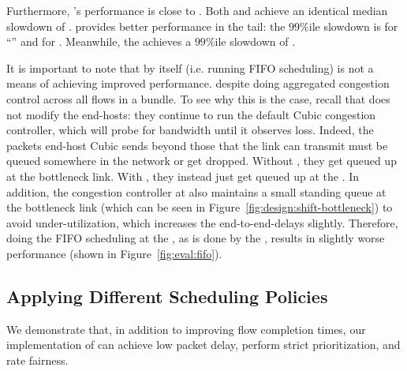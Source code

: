 Furthermore, \name's performance is close to \optimal.
Both \name and \optimal achieve an identical median slowdown of \overviewBenefitsBundlerMedian.
\optimal provides better performance in the tail: the $99\%$ile slowdown is \overviewBenefitsOptimalTail for ``\optimal'' and \overviewBenefitsBundlerTail for \name.
Meanwhile, the \baseline achieves a $99\%$ile slowdown of \overviewBenefitsBaselineTail.

 It is important to note that \name by itself (i.e. running FIFO scheduling) is not a means of achieving improved performance. 
despite doing aggregated congestion control across all flows in a bundle.
To see why this is the case, recall that \name does not modify the end-hosts: they continue to run the default Cubic congestion controller, which will probe for bandwidth until it observes loss.
Indeed, the packets end-host Cubic sends beyond those that the link can transmit must be queued somewhere in the network or get dropped. Without \name, they get queued up at the bottleneck link. With \name, they instead just get queued up at the \inbox. In addition, the congestion controller at \inbox also maintains a small standing queue at the bottleneck link (which can be seen in Figure~\ref{fig:design:shift-bottleneck}) to avoid under-utilization, which increases the end-to-end-delays slightly. Therefore, doing the FIFO scheduling at the \name, as is done by the \baseline, results in slightly worse performance (shown in Figure~\ref{fig:eval:fifo}).



\subsection{Applying Different Scheduling Policies}\label{s:eval:policies}
We demonstrate that, in addition to improving flow completion times, our implementation of \name can achieve low packet delay, perform strict prioritization, and rate fairness.

